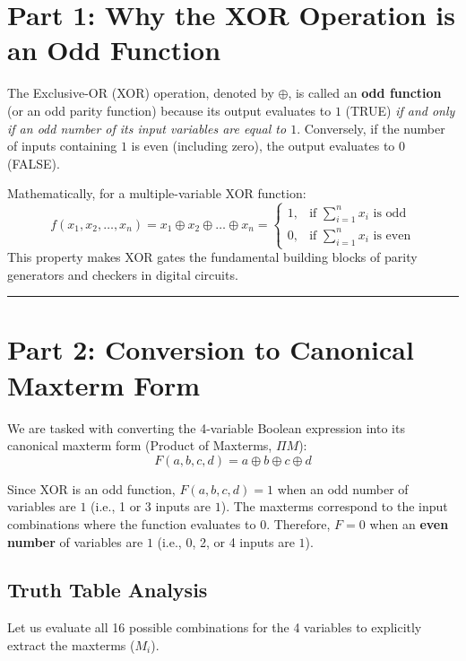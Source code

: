 \documentclass[12pt,a3paper]{article}
\begin{document}
\begin{enumerate}
\begin{tcolorbox}[enhanced,breakable,ansbox,colback=cA!4,colframe=cA,boxrule=0.8pt,arc=5pt,title={\textbf{Answer}},fonttitle=\bfseries\color{white},colbacktitle=cA]

\section*{Part 1: Why the XOR Operation is an Odd Function}

The Exclusive-OR (XOR) operation, denoted by $\oplus$, is called an \textbf{odd function} (or an odd parity function) because its output evaluates to $1$ (TRUE) \textit{if and only if an odd number of its input variables are equal to $1$}. Conversely, if the number of inputs containing $1$ is even (including zero), the output evaluates to $0$ (FALSE). 

Mathematically, for a multiple-variable XOR function:
\begin{equation}
    f(x_1, x_2, \dots, x_n) = x_1 \oplus x_2 \oplus \dots \oplus x_n = 
    \begin{cases} 
        1, & \text{if } \sum_{i=1}^n x_i \text{ is odd} \\
        0, & \text{if } \sum_{i=1}^n x_i \text{ is even} 
    \end{cases}
\end{equation}
This property makes XOR gates the fundamental building blocks of parity generators and checkers in digital circuits.

\vspace{0.2cm}
\hrule
\vspace{0.4cm}

\section*{Part 2: Conversion to Canonical Maxterm Form}

We are tasked with converting the 4-variable Boolean expression into its canonical maxterm form (Product of Maxterms, $\Pi M$):
\[ F(a, b, c, d) = a \oplus b \oplus c \oplus d \]

Since XOR is an odd function, $F(a, b, c, d) = 1$ when an odd number of variables are $1$ (i.e., 1 or 3 inputs are $1$). The maxterms correspond to the input combinations where the function evaluates to \textbf{$0$}. Therefore, $F = 0$ when an \textbf{even number} of variables are $1$ (i.e., 0, 2, or 4 inputs are $1$).

\subsection*{Truth Table Analysis}
Let us evaluate all 16 possible combinations for the 4 variables to explicitly extract the maxterms ($M_i$).


\end{tcolorbox}
\end{enumerate}
\end{document}
